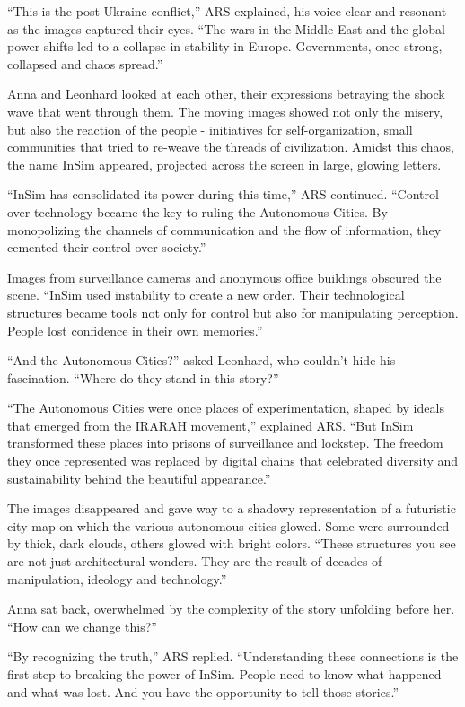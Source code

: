 \documentclass[
]{article}
\begin{document}
``This is the post-Ukraine conflict,'' ARS explained, his voice clear
and resonant as the images captured their eyes. ``The wars in the Middle
East and the global power shifts led to a collapse in stability in
Europe. Governments, once strong, collapsed and chaos spread.''

Anna and Leonhard looked at each other, their expressions betraying the
shock wave that went through them. The moving images showed not only the
misery, but also the reaction of the people - initiatives for
self-organization, small communities that tried to re-weave the threads
of civilization. Amidst this chaos, the name InSim appeared, projected
across the screen in large, glowing letters.

``InSim has consolidated its power during this time,'' ARS continued.
``Control over technology became the key to ruling the Autonomous
Cities. By monopolizing the channels of communication and the flow of
information, they cemented their control over society.''

Images from surveillance cameras and anonymous office buildings obscured
the scene. ``InSim used instability to create a new order. Their
technological structures became tools not only for control but also for
manipulating perception. People lost confidence in their own memories.''

``And the Autonomous Cities?'' asked Leonhard, who couldn't hide his
fascination. ``Where do they stand in this story?''

``The Autonomous Cities were once places of experimentation, shaped by
ideals that emerged from the IRARAH movement,'' explained ARS. ``But
InSim transformed these places into prisons of surveillance and
lockstep. The freedom they once represented was replaced by digital
chains that celebrated diversity and sustainability behind the beautiful
appearance.''

The images disappeared and gave way to a shadowy representation of a
futuristic city map on which the various autonomous cities glowed. Some
were surrounded by thick, dark clouds, others glowed with bright colors.
``These structures you see are not just architectural wonders. They are
the result of decades of manipulation, ideology and technology.''

Anna sat back, overwhelmed by the complexity of the story unfolding
before her. ``How can we change this?''

``By recognizing the truth,'' ARS replied. ``Understanding these
connections is the first step to breaking the power of InSim. People
need to know what happened and what was lost. And you have the
opportunity to tell those stories.''
\end{document}
